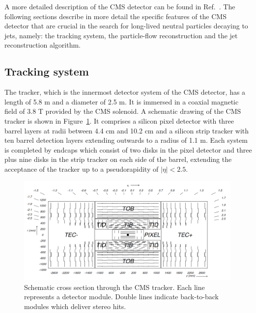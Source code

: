 A more detailed description of the CMS detector can be found in Ref.~\cite{Chatrchyan:2008zzk}.  
The following sections describe in more detail the specific features of the CMS detector
that are crucial in the search for long-lived neutral particles decaying to jets, namely: the
tracking system, the particle-flow reconstruction and the jet reconstruction algorithm.

\subsection{Tracking system}
\label{subsec:trackreco}

The tracker, which is the innermost detector system of the CMS detector, has a length
of 5.8 m and a
diameter of 2.5 m. It is immersed in a coaxial magnetic field of 3.8 T
provided by the CMS solenoid. A schematic drawing of the CMS tracker is shown in
Figure~\ref{fig:tracker}. It comprises a silicon pixel detector with three barrel layers at radii
between 4.4 cm and 10.2 cm and a silicon strip tracker with ten barrel
detection layers extending outwards to a radius of 1.1 m. Each system is
completed by endcaps which consist of two disks in the pixel detector and three
plus nine disks in the strip tracker on each side of the barrel, extending
the acceptance of the tracker up to a pseudorapidity of $|\eta| < 2.5$.
\begin{figure}[!h]
\centering
\includegraphics[width=0.99\textwidth]{plots/intro/tracker.png}
\caption{Schematic cross section through the CMS tracker. Each line represents a
detector module. Double lines indicate back-to-back modules which deliver stereo
hits.\label{fig:tracker}}
\end{figure}

